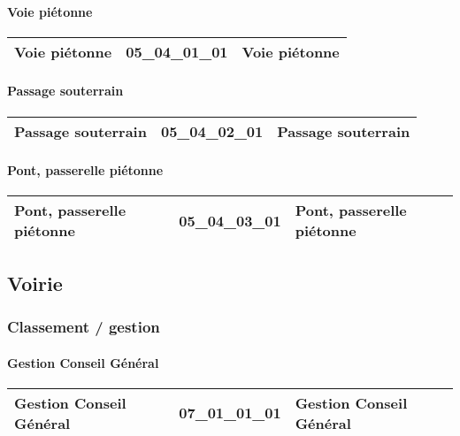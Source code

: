 \documentclass[12pt,titlepage]{book}
\begin{document}
\paragraph{Voie piétonne}
\noindent
\vspace{\baselineskip}

\renewcommand{\arraystretch}{1.2}
\begin{supertabular}{|p{10cm}|c|p{15cm}|}
 Voie piétonne & 05\_04\_01\_01 & Voie piétonne\\
\hline
\end{supertabular}


\paragraph{Passage souterrain}
\noindent
\vspace{\baselineskip}

\renewcommand{\arraystretch}{1.2}
\begin{supertabular}{|p{10cm}|c|p{15cm}|}
 Passage souterrain & 05\_04\_02\_01 & Passage souterrain\\
\hline
\end{supertabular}


\paragraph{Pont, passerelle piétonne}
\noindent
\vspace{\baselineskip}

\renewcommand{\arraystretch}{1.2}
\begin{supertabular}{|p{10cm}|c|p{15cm}|}
 Pont, passerelle piétonne & 05\_04\_03\_01 & Pont, passerelle piétonne\\
\hline
\end{supertabular}
\subsection{Voirie}
\subsubsection{\large Classement / gestion}
\paragraph{Gestion Conseil Général}
\noindent
\vspace{\baselineskip}

\renewcommand{\arraystretch}{1.2}
\begin{supertabular}{|p{10cm}|c|p{15cm}|}
 Gestion Conseil Général & 07\_01\_01\_01 & Gestion Conseil Général\\
\hline
\end{supertabular}
\end{document}
